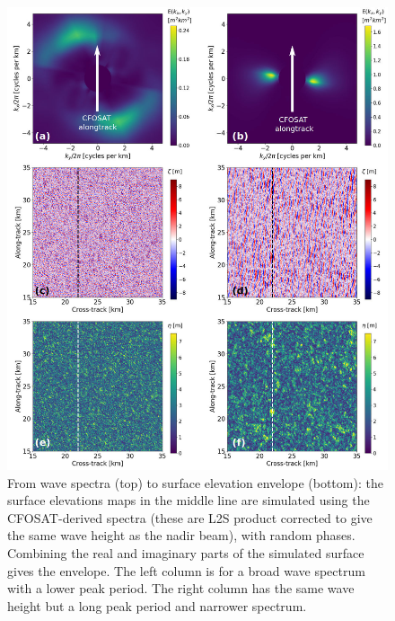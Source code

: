 {%
\begin{figure}[hbt!]
\centerline{\includegraphics[width=\textwidth]{FIGS_CH_GROUPS/DeCarlo_fig2.jpg}}
    \caption{From wave spectra (top) to surface elevation envelope (bottom): the surface elevations maps in the middle line are simulated using the CFOSAT-derived spectra (these are L2S product corrected to give the same wave height as the nadir beam), with random phases. Combining the real and imaginary parts of the simulated surface gives the envelope. The left column is for a broad wave spectrum with a lower peak period. The right column has the same wave height but a long peak period and narrower spectrum. } 
   \label{figure:groups_storm2}
\end{figure}


}
